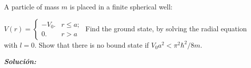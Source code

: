 \documentclass[10pt]{article}
\begin{document}
\medskip
\begin{tcolorbox}[colback=gray!10, colframe=black, title=Problem 11]


A particle of mass $m$ is placed in a finite spherical well:


$V(r)= 
\begin{cases}
    -V_{0}. & r\leq a; \\
    0. & r>a
\end{cases}
$
 Find the ground state, by solving the radial equation with $l=0$. Show that there
is no bound state if $V_{0}a^{2}<\pi^{2}\hbar^{2}/8m$.


\end{tcolorbox}
\medskip


\Large{\textit{\textbf{Solución:}}}

\medskip
\end{document}
